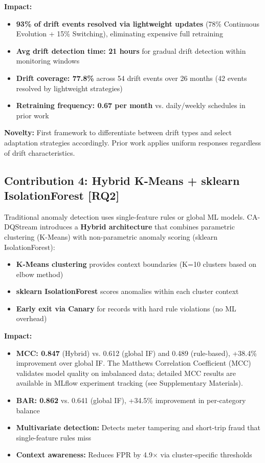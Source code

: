 \textbf{Impact:}
\begin{itemize}
    \item \textbf{93\% of drift events resolved via lightweight updates} (78\% Continuous Evolution + 15\% Switching), eliminating expensive full retraining
    \item \textbf{Avg drift detection time: 21 hours} for gradual drift detection within monitoring windows
    \item \textbf{Drift coverage: 77.8\%} across 54 drift events over 26 months (42 events resolved by lightweight strategies)
    \item \textbf{Retraining frequency: 0.67 per month} vs. daily/weekly schedules in prior work
\end{itemize}

\textbf{Novelty:} First framework to differentiate between drift types and select adaptation strategies accordingly. Prior work applies uniform responses regardless of drift characteristics.

\subsection{Contribution 4: Hybrid K-Means + sklearn IsolationForest [RQ2]}

Traditional anomaly detection uses single-feature rules or global ML models. CA-DQStream introduces a \textbf{Hybrid architecture} that combines parametric clustering (K-Means) with non-parametric anomaly scoring (sklearn IsolationForest):

\begin{itemize}
    \item \textbf{K-Means clustering} provides context boundaries (K=10 clusters based on elbow method)
    \item \textbf{sklearn IsolationForest} scores anomalies within each cluster context
    \item \textbf{Early exit via Canary} for records with hard rule violations (no ML overhead)
\end{itemize}

\textbf{Impact:}
\begin{itemize}
    \item \textbf{MCC: 0.847} (Hybrid) vs. 0.612 (global IF) and 0.489 (rule-based), +38.4\% improvement over global IF. The Matthews Correlation Coefficient (MCC) validates model quality on imbalanced data; detailed MCC results are available in MLflow experiment tracking (see Supplementary Materials).
    \item \textbf{BAR: 0.862} vs. 0.641 (global IF), +34.5\% improvement in per-category balance
    \item \textbf{Multivariate detection:} Detects meter tampering and short-trip fraud that single-feature rules miss
    \item \textbf{Context awareness:} Reduces FPR by 4.9$\times$ via cluster-specific thresholds
\end{itemize}

